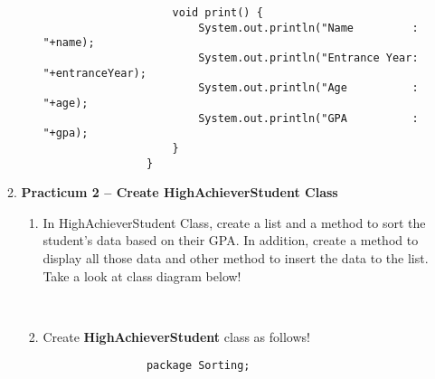 \documentclass[12pt,titlepage]{article}
\begin{document}
\begin{enumerate}
\begin{enumerate}[label=\textbf{\alph*.}]
\begin{enumerate}[label=\arabic*.]
\begin{verbatim}
                    void print() {
                        System.out.println("Name         : "+name);
                        System.out.println("Entrance Year: "+entranceYear);
                        System.out.println("Age          : "+age);
                        System.out.println("GPA          : "+gpa);
                    }
                }
            \end{verbatim}
        \end{enumerate}
        \item \textbf{Practicum 2 – Create HighAchieverStudent Class}
        \begin{enumerate}[label=\arabic*.]
            \item In HighAchieverStudent Class, create a list and a method to sort the student’s data based on their GPA. In addition, create a method to display all those data and other method to insert the data to the list. Take a look at class diagram below!
            \mbox{}\\
            \mbox{}\\
            \item Create \textbf{HighAchieverStudent} class as follows!
            \begin{verbatim}
                package Sorting;


\end{verbatim}
\end{enumerate}
\end{enumerate}
\end{enumerate}
\end{document}
